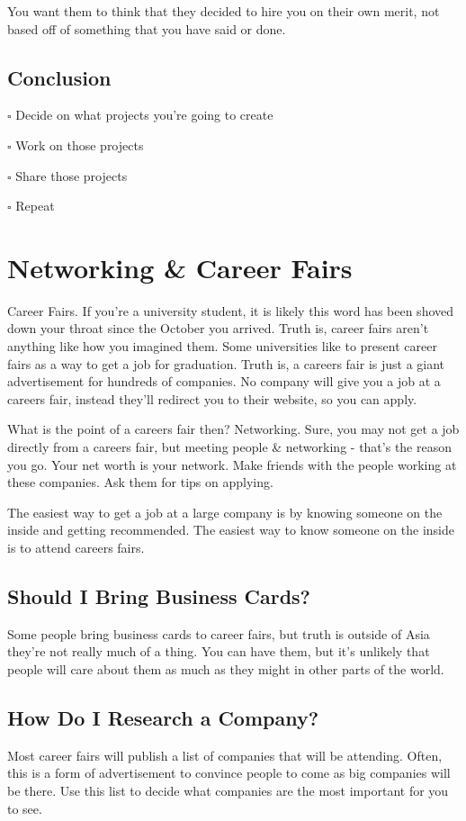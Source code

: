 \documentclass{article}
\begin{document}
You want them to think that they decided to hire you on their own merit,
not based off of something that you have said or done.
\subsection{Conclusion}
$\square$ Decide on what projects you're going to create

$\square$ Work on those projects

$\square$ Share those projects

$\square$ Repeat
\section{Networking \& Career Fairs}
Career Fairs. If you're a university student, it is likely this word has
been shoved down your throat since the October you arrived. Truth is,
career fairs aren't anything like how you imagined them. Some
universities like to present career fairs as a way to get a job for
graduation. Truth is, a careers fair is just a giant advertisement for
hundreds of companies. No company will give you a job at a careers fair,
instead they'll redirect you to their website, so you can apply.

What is the point of a careers fair then? Networking. Sure, you may not
get a job directly from a careers fair, but meeting people \& networking
- that's the reason you go. Your net worth is your network. Make friends
with the people working at these companies. Ask them for tips on
applying.

The easiest way to get a job at a large company is by knowing someone on
the inside and getting recommended. The easiest way to know someone on
the inside is to attend careers fairs.
\subsection{Should I Bring Business Cards?}
Some people bring business cards to career fairs, but truth is outside
of Asia they're not really much of a thing. You can have them, but it's
unlikely that people will care about them as much as they might in other
parts of the world.
\subsection{How Do I Research a Company?}
Most career fairs will publish a list of companies that will be
attending. Often, this is a form of advertisement to convince people to
come as big companies will be there. Use this list to decide what
companies are the most important for you to see.
\end{document}
